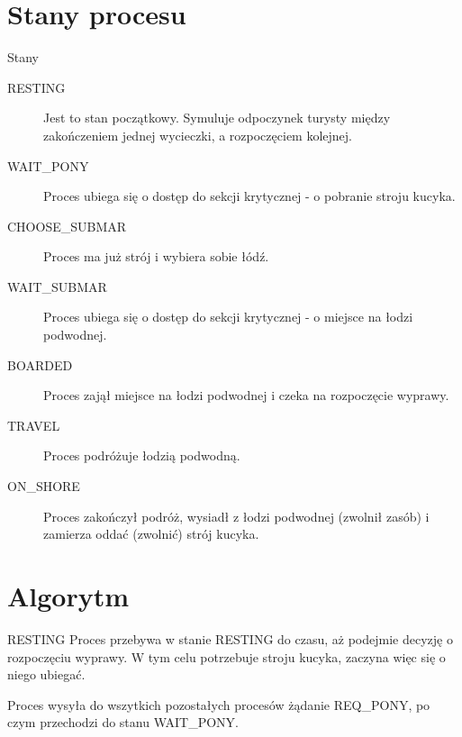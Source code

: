 \documentclass{beamer}
\begin{document}
\section{Stany procesu}
\begin{frame}{Stany}
    \internallinenumbers
    \resetlinenumber[1]
    \begin{description}
        \item [RESTING] Jest to stan początkowy. Symuluje odpoczynek turysty między zakończeniem jednej wycieczki, a rozpoczęciem kolejnej.
        \item [WAIT\_PONY] Proces ubiega się o dostęp do sekcji krytycznej - o pobranie stroju kucyka.
        \item [CHOOSE\_SUBMAR] Proces ma już strój i wybiera sobie łódź.
        \item [WAIT\_SUBMAR] Proces ubiega się o dostęp do sekcji krytycznej - o miejsce na łodzi podwodnej.
        \item [BOARDED] Proces zajął miejsce na łodzi podwodnej i czeka na rozpoczęcie wyprawy.
        \item [TRAVEL] Proces podróżuje łodzią podwodną.
        \item [ON\_SHORE] Proces zakończył podróż, wysiadł z łodzi podwodnej (zwolnił zasób) i zamierza oddać (zwolnić) strój kucyka.
    \end{description}

\end{frame}

\section{Algorytm}
\begin{frame}{RESTING}
    \internallinenumbers
    \resetlinenumber[1]
    Proces przebywa w stanie RESTING do czasu, aż podejmie decyzję o rozpoczęciu wyprawy. W tym celu potrzebuje stroju kucyka, zaczyna więc się o niego ubiegać.
    
    \vspace{0.4cm}
    Proces wysyła do wszytkich pozostałych procesów żądanie REQ\_PONY, po czym przechodzi do stanu WAIT\_PONY.
\end{frame}
\end{document}
